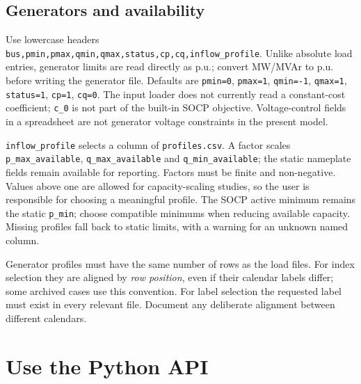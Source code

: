 \documentclass[11pt,a4paper]{article}
\newcommand{\code}[1]{\nolinkurl{#1}}
\begin{document}
\subsection{Generators and availability}
Use lowercase headers \code{bus,pmin,pmax,qmin,qmax,status,cp,cq,inflow_profile}.
Unlike absolute load entries, generator limits are read directly as p.u.;
convert MW/MVAr to p.u. before writing the generator file. Defaults are
\code{pmin=0}, \code{pmax=1}, \code{qmin=-1}, \code{qmax=1},
\code{status=1}, \code{cp=1}, \code{cq=0}. The input loader does not currently
read a constant-cost coefficient; \code{c_0} is not part of the built-in SOCP
objective. Voltage-control fields in a spreadsheet are not generator voltage
constraints in the present model.

\code{inflow_profile} selects a column of \code{profiles.csv}. A factor scales
\code{p_max_available}, \code{q_max_available} and \code{q_min_available};
the static nameplate fields remain available for reporting. Factors must be
finite and non-negative. Values above one are allowed for capacity-scaling
studies, so the user is responsible for choosing a meaningful profile.
The SOCP active minimum remains the static \code{p_min}; choose compatible
minimums when reducing available capacity. Missing profiles fall back to
static limits, with a warning for an unknown named column.

Generator profiles must have the same number of rows as the load files.
For index selection they are aligned by \emph{row position}, even if their
calendar labels differ; some archived cases use this convention. For label
selection the requested label must exist in every relevant file. Document
any deliberate alignment between different calendars.

\section{Use the Python API}
\label{sec:api}
\end{document}
